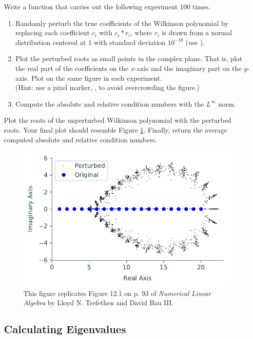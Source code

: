 \begin{problem}
Write a function that carries out the following experiment 100 times.
\begin{enumerate}
\item Randomly perturb the true coefficients of the Wilkinson polynomial by replacing each coefficient $c_i$ with $c_i*r_i$, where $r_i$ is drawn from a normal distribution centered at 1 with standard deviation $10^{-10}$ (use ).
\item Plot the perturbed roots as small points in the complex plane.
That is, plot the real part of the coefficients on the $x$-axis and the imaginary part on the $y$-axis.
Plot on the same figure in each experiment.
\\(Hint: use a pixel marker, , to avoid overcrowding the figure.)
\item Compute the absolute and relative condition numbers with the $L^{\infty}$ norm.
\end{enumerate}
Plot the roots of the unperturbed Wilkinson polynomial with the perturbed roots.
Your final plot should resemble Figure \ref{fig:wilkinsonpolynomial_many}.
Finally, return the average computed absolute and relative condition numbers.

\begin{figure}[H]
\includegraphics[width=.7\linewidth]{figures/wilkinson_prob_solution.pdf}
\caption{
This figure replicates Figure 12.1 on p. 93 of \emph{Numerical Linear Algebra} by Lloyd N. Trefethen and David Bau III.}
\label{fig:wilkinsonpolynomial_many}
\end{figure}

\label{prob:wilkinson-polynomial-roots}
\end{problem}

\subsection*{Calculating Eigenvalues} %


